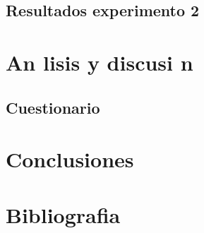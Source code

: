 \documentclass{article}
\begin{document}
\subsection{Resultados experimento 2}

\section{An lisis y discusi n}

\subsection{Cuestionario}

\section{Conclusiones}

\section{Bibliografia}
\end{document}
